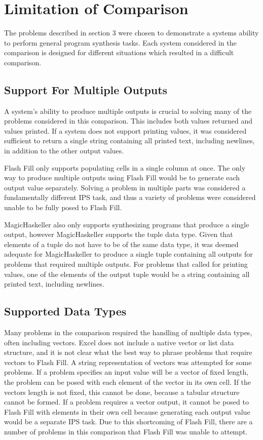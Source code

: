 \section{Limitation of Comparison}

The problems described in section 3 were chosen to demonstrate a systems ability to perform general program synthesis tasks. Each system considered in the comparison is designed for different situations which resulted in a difficult comparison.

\subsection{Support For Multiple Outputs}

A system's ability to produce multiple outputs is crucial to solving many of the problems considered in this comparison. This includes both values returned and values printed. If a system does not support printing values, it was considered sufficient to return a single string containing all printed text, including newlines, in addition to the other output values.

Flash Fill only supports populating cells in a single column at once. The only way to produce multiple outputs using Flash Fill would be to generate each output value separately. Solving a problem in multiple parts was considered a fundamentally different IPS task, and thus a variety of problems were considered unable to be fully posed to Flash Fill.

MagicHaskeller also only supports synthesizing programs that produce a single output, however MagicHaskeller supports the tuple data type. Given that elements of a tuple do not have to be of the same data type, it was deemed adequate for MagicHaskeller to produce a single tuple containing all outputs for problems that required multiple outputs. For problems that called for printing values, one of the elements of the output tuple would be a string containing all printed text, including newlines.

\subsection{Supported Data Types}

Many problems in the comparison required the handling of multiple data types, often including vectors.  Excel does not include a native vector or list data structure, and it is not clear what the best way to phrase problems that require vectors to Flash Fill. A string representation of vectors was attempted for some problems. If a problem specifies an input value will be a vector of fixed length, the problem can be posed with each element of the vector in its own cell. If the vectors length is not fixed, this cannot be done, because a tabular structure cannot be formed. If a problem requires a vector output, it cannot be posed to Flash Fill with elements in their own cell because generating each output value would be a separate IPS task. Due to this shortcoming of Flash Fill, there are a number of problems in this comparison that Flash Fill was unable to attempt.

